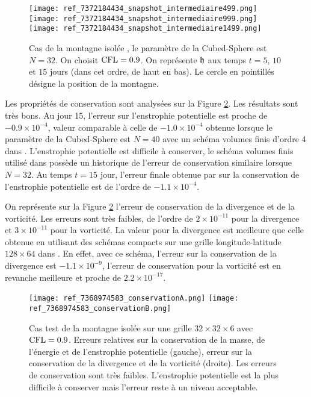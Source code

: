 \begin{figure}[htbp]
\begin{center}
\texttt{[image: ref\_7372184434\_snapshot\_intermediaire499.png]}\\
\texttt{[image: ref\_7372184434\_snapshot\_intermediaire999.png]}\\
\texttt{[image: ref\_7372184434\_snapshot\_intermediaire1499.png]}
\end{center}
\caption{Cas de la montagne isolée \cite{Williamson1992}, le paramètre de la Cubed-Sphere est $N=32$. On choisit $\text{CFL}=0.9$.  On représente $\mathfrak{h}$ aux temps $t=5$, $10$ et $15$ jours (dans cet ordre, de haut en bas). Le cercle en pointillés désigne la position de la montagne.}
\label{fig: williamson 5 space height}
\end{figure}

Les propriétés de conservation sont analysées sur la Figure \ref{fig: williamson 5 conservation}. Les résultats sont très bons. Au jour 15, l'erreur sur l'enstrophie potentielle est proche de $-0.9 \times 10^{-4}$, valeur comparable à celle de $-1.0 \times 10^{-4}$ obtenue lorsque le paramètre de la Cubed-Sphere est $N=40$ avec un schéma volumes finis d'ordre 4 dans \cite{Ullrich2010}. L'enstrophie potentielle est difficile à conserver, le schéma volumes finis utilisé dans \cite{Chen2008} possède un historique de l'erreur de conservation similaire lorsque $N=32$. Au temps $t=15$ jour, l'erreur finale obtenue par \cite{Chen2008} sur la conservation de l'enstrophie potentielle est de l'ordre de $-1.1 \times 10^{-4}$.

On représente sur la Figure \ref{fig: williamson 5 conservation} l'erreur de conservation de la divergence et de la vorticité. Les erreurs sont très faibles, de l'ordre de $2 \times 10^{-11}$ pour la divergence et $3 \times 10^{-11}$ pour la vorticité. La valeur pour la divergence est meilleure que celle obtenue en utilisant des schémas compacts sur une grille longitude-latitude $128 \times 64$ dans \cite{Nihei2003}. En effet, avec ce schéma, l'erreur sur la conservation de la divergence est $-1.1 \times 10^{-9}$, l'erreur de conservation pour la vorticité est en revanche meilleure et proche de $2.2 \times 10^{-17}$. 

\begin{figure}[htbp]
\begin{center}
\texttt{[image: ref\_7368974583\_conservationA.png]}
\texttt{[image: ref\_7368974583\_conservationB.png]}
\end{center}
\caption{Cas test de la montagne isolée \cite{Williamson1992} sur une grille $32 \times 32 \times 6$ avec $\text{CFL}=0.9$. Erreurs relatives sur la conservation de la masse, de l'énergie et de l'enstrophie potentielle (gauche), erreur sur la conservation de la divergence et de la vorticité (droite). Les erreurs de conservation sont très faibles. L'enstrophie potentielle est la plus difficile à conserver mais l'erreur reste à un niveau acceptable.}
\label{fig: williamson 5 conservation}
\end{figure}

